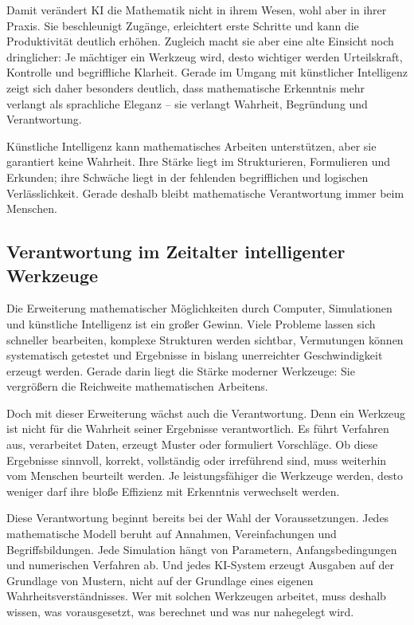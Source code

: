 Damit verändert KI die Mathematik nicht in ihrem Wesen, wohl aber in ihrer Praxis. Sie beschleunigt Zugänge, erleichtert erste Schritte und kann die Produktivität deutlich erhöhen. Zugleich macht sie aber eine alte Einsicht noch dringlicher: Je mächtiger ein Werkzeug wird, desto wichtiger werden Urteilskraft, Kontrolle und begriffliche Klarheit. Gerade im Umgang mit künstlicher Intelligenz zeigt sich daher besonders deutlich, dass mathematische Erkenntnis mehr verlangt als sprachliche Eleganz -- sie verlangt Wahrheit, Begründung und Verantwortung.

\begin{DidacticBox}
	\label{box:ki-wahrheit}
	Künstliche Intelligenz kann mathematisches Arbeiten unterstützen, aber sie garantiert keine Wahrheit. Ihre Stärke liegt im Strukturieren, Formulieren und Erkunden; ihre Schwäche liegt in der fehlenden begrifflichen und logischen Verlässlichkeit. Gerade deshalb bleibt mathematische Verantwortung immer beim Menschen.
\end{DidacticBox}


\subsection{Verantwortung im Zeitalter intelligenter Werkzeuge}

Die Erweiterung mathematischer Möglichkeiten durch Computer, Simulationen und künstliche Intelligenz ist ein großer Gewinn. Viele Probleme lassen sich schneller bearbeiten, komplexe Strukturen werden sichtbar, Vermutungen können systematisch getestet und Ergebnisse in bislang unerreichter Geschwindigkeit erzeugt werden. Gerade darin liegt die Stärke moderner Werkzeuge: Sie vergrößern die Reichweite mathematischen Arbeitens.

Doch mit dieser Erweiterung wächst auch die Verantwortung. Denn ein Werkzeug ist nicht für die Wahrheit seiner Ergebnisse verantwortlich. Es führt Verfahren aus, verarbeitet Daten, erzeugt Muster oder formuliert Vorschläge. Ob diese Ergebnisse sinnvoll, korrekt, vollständig oder irreführend sind, muss weiterhin vom Menschen beurteilt werden. Je leistungsfähiger die Werkzeuge werden, desto weniger darf ihre bloße Effizienz mit Erkenntnis verwechselt werden.

Diese Verantwortung beginnt bereits bei der Wahl der Voraussetzungen. Jedes mathematische Modell beruht auf Annahmen, Vereinfachungen und Begriffsbildungen. Jede Simulation hängt von Parametern, Anfangsbedingungen und numerischen Verfahren ab. Und jedes KI-System erzeugt Ausgaben auf der Grundlage von Mustern, nicht auf der Grundlage eines eigenen Wahrheitsverständnisses. Wer mit solchen Werkzeugen arbeitet, muss deshalb wissen, was vorausgesetzt, was berechnet und was nur nahegelegt wird.

